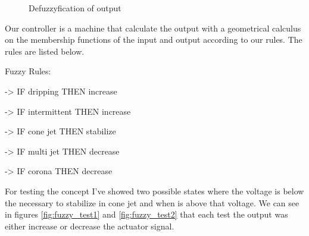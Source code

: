 \begin{multicols}{2}
            \begin{figure}[H]
                \centering
                \caption{Defuzzyfication of output}
                \label{fig:fuzzy_output}
            \end{figure}

        \end{multicols}


        Our controller is a machine that calculate the output with a geometrical calculus on the membership functions of the input and output according to our rules.
        The rules are listed below.

        Fuzzy Rules:

        -> IF dripping THEN increase

        -> IF intermittent THEN increase

        -> IF cone jet THEN stabilize

        -> IF multi jet THEN decrease

        -> IF corona THEN decrease



        For testing the concept I've showed two possible states where the voltage is below the necessary to stabilize in cone jet and when is above that voltage. We can see in figures \ref{fig:fuzzy_test1} and \ref{fig:fuzzy_test2} that each test the output was either increase or decrease the actuator signal.
        
